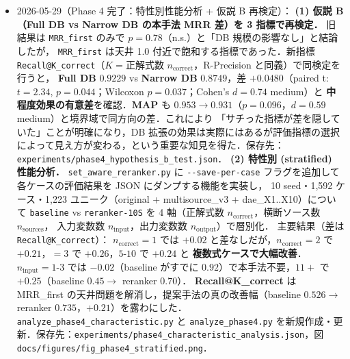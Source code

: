 \documentclass[11pt,a4paper]{jsarticle}
\begin{document}
\begin{itemize}[nosep]
  \item 2026-05-29（Phase 4 完了：特性別性能分析 + 仮説 B 再検定）：
    \textbf{(1) 仮説 B（Full DB vs Narrow DB の本手法 MRR 差）を 3 指標で再検定．}
    旧結果は \texttt{MRR\_first} のみで $p=0.78$（n.s.）と「DB 規模の影響なし」と結論したが，
    \texttt{MRR\_first} は天井 1.0 付近で飽和する指標であった．新指標 \texttt{Recall@K\_correct}（$K=$正解式数 $n_{\text{correct}}$，R-Precision と同義）で同検定を行うと，
    \textbf{Full DB} $0.9229$ vs \textbf{Narrow DB} $0.8749$，差 $+0.0480$（paired t: $t=2.34$, $p=0.044$；Wilcoxon $p=0.037$；Cohen's $d=0.74$ medium）と
    \textbf{中程度効果の有意差}を確認．\textbf{MAP} も $0.953 \to 0.931$（$p=0.096$，$d=0.59$ medium）と境界域で同方向の差．これにより
    「サチった指標が差を隠していた」ことが明確になり，DB 拡張の効果は実際にはあるが評価指標の選択によって見え方が変わる，という重要な知見を得た．保存先：\texttt{experiments/phase4\_hypothesis\_b\_test.json}．
    \textbf{(2) 特性別 (stratified) 性能分析．}
    \texttt{set\_aware\_reranker.py} に \texttt{-{}-save-per-case} フラグを追加して各ケースの評価結果を JSON にダンプする機能を実装し，
    10 seed・1,592 ケース・1,223 ユニーク（original + multisource\_v3 + dae\_X1..X10）について
    \texttt{baseline} vs \texttt{reranker-10S} を 4 軸（正解式数 $n_{\text{correct}}$，横断ソース数 $n_{\text{sources}}$，
    入力変数数 $n_{\text{input}}$，出力変数数 $n_{\text{output}}$）で層別化．
    主要結果（差は \texttt{Recall@K\_correct}）：
    $n_{\text{correct}}=1$ では $+0.02$ と差なしだが，$n_{\text{correct}}=2$ で $+0.21$，$=3$ で $+0.26$，$5\text{-}10$ で $+0.24$ と
    \textbf{複数式ケースで大幅改善}．$n_{\text{input}}=1\text{-}3$ では $-0.02$（baseline がすでに $0.92$）で本手法不要，$11+$ で $+0.25$（baseline $0.45 \to$ reranker $0.70$）．
    \textbf{Recall@K\_correct} は MRR\_first の天井問題を解消し，提案手法の真の改善幅（baseline $0.526 \to$ reranker $0.735$，$+0.21$）を露わにした．
    \texttt{analyze\_phase4\_characteristic.py} と \texttt{analyze\_phase4.py} を新規作成・更新．保存先：\texttt{experiments/phase4\_characteristic\_analysis.json}，図 \texttt{docs/figures/fig\_phase4\_stratified.png}．


\end{itemize}
\end{document}
